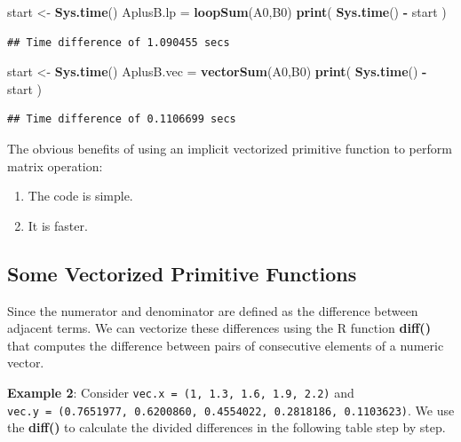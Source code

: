 \documentclass[
]{book}
\newenvironment{Shaded}{\begin{snugshade}}{\end{snugshade}}
\newcommand{\FunctionTok}[1]{\textcolor[rgb]{0.13,0.29,0.53}{\textbf{#1}}}
\newcommand{\NormalTok}[1]{#1}
\newcommand{\OtherTok}[1]{\textcolor[rgb]{0.56,0.35,0.01}{#1}}
\newcommand{\SpecialCharTok}[1]{\textcolor[rgb]{0.81,0.36,0.00}{\textbf{#1}}}
\begin{document}
\begin{Shaded}
\begin{Highlighting}[]
\NormalTok{start }\OtherTok{\textless{}{-}} \FunctionTok{Sys.time}\NormalTok{()}
\NormalTok{AplusB.lp }\OtherTok{=} \FunctionTok{loopSum}\NormalTok{(A0,B0)}
\FunctionTok{print}\NormalTok{( }\FunctionTok{Sys.time}\NormalTok{() }\SpecialCharTok{{-}}\NormalTok{ start )}
\end{Highlighting}
\end{Shaded}

\begin{verbatim}
## Time difference of 1.090455 secs
\end{verbatim}

\begin{Shaded}
\begin{Highlighting}[]
\NormalTok{start }\OtherTok{\textless{}{-}} \FunctionTok{Sys.time}\NormalTok{()}
\NormalTok{AplusB.vec }\OtherTok{=} \FunctionTok{vectorSum}\NormalTok{(A0,B0)}
\FunctionTok{print}\NormalTok{( }\FunctionTok{Sys.time}\NormalTok{() }\SpecialCharTok{{-}}\NormalTok{ start )}
\end{Highlighting}
\end{Shaded}

\begin{verbatim}
## Time difference of 0.1106699 secs
\end{verbatim}

The obvious benefits of using an implicit vectorized primitive function to perform matrix operation:

\begin{enumerate}
\def\labelenumi{\arabic{enumi}.}
\item
  The code is simple.
\item
  It is faster.
\end{enumerate}

\hypertarget{some-vectorized-primitive-functions}{%
\subsection{Some Vectorized Primitive Functions}\label{some-vectorized-primitive-functions}}

Since the numerator and denominator are defined as the difference between adjacent terms. We can vectorize these differences using the R function \textbf{diff()} that computes the difference between pairs of consecutive elements of a numeric vector.

\textbf{Example 2}: Consider \texttt{vec.x\ =\ (1,\ 1.3,\ 1.6,\ 1.9,\ 2.2)} and \texttt{vec.y\ =\ (0.7651977,\ 0.6200860,\ 0.4554022,\ 0.2818186,\ 0.1103623)}. We use the \textbf{diff()} to calculate the divided differences in the following table step by step.
\end{document}
